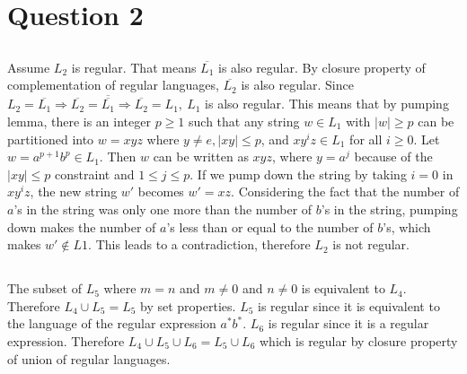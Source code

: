 \documentclass[12pt]{article}
\begin{document}
\newpage

\section{Question 2}

\subsection{}

\begin{center}
Assume $L_2$ is regular. That means $\overline{L_1}$ is also regular. By closure property of complementation of regular languages, $\overline{L_2}$ is also regular. Since $L_2 = \overline{L_1} \Rightarrow \overline{L_2}=\overline{\overline{L_1}} \Rightarrow \overline{L_2}=L_1,\ L_1$ is also regular. This means that by pumping lemma, there is an integer $p \ge 1$ such that any string $w \in L_1$ with $\vert w\vert \ge p$ can be partitioned into $w=xyz$ where $y\neq e, \vert xy\vert \le p$, and $xy^iz \in L_1$ for all $i \ge 0$. Let $w = a^{p+1}b^p \in L_1$. Then $w$ can be written as $xyz$, where $y = a^j$ because of the $\vert xy\vert \leq p$ constraint and $1 \le j \le p$. If we pump down the string by taking $i=0$ in $xy^iz$, the new string $w'$ becomes $w' = xz$. Considering the fact that the number of $a$'s in the string was only one more than the number of $b$'s in the string, pumping down makes the number of $a$'s less than or equal to the number of $b$'s, which makes $w' \notin L1$. This leads to a contradiction, therefore $L_2$ is not regular.
\end{center}

\subsection{}

\begin{center}
The subset of $L_5$ where $m=n$ and $m \neq 0$ and $n \neq 0$ is equivalent to $L_4$. Therefore $L_4 \cup L_5 = L_5$ by set properties. $L_5$ is regular since it is equivalent to the language of the regular expression $a^*b^*$. $L_6$ is regular since it is a regular expression. Therefore $L_4 \cup L_5 \cup L_6 = L_5 \cup L_6$ which is regular by closure property of union of regular languages.
\end{center}
\end{document}
